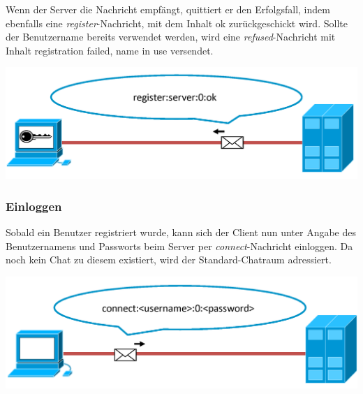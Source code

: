 \documentclass[12pt,a4paper,bibliography=totocnumbered,listof=totocnumbered]{scrartcl}
\begin{document}
Wenn der Server die Nachricht empfängt, quittiert er den Erfolgsfall, indem ebenfalls eine  \textit{register}-Nachricht, mit dem Inhalt \glqq ok\grqq{} zurückgeschickt wird. Sollte der Benutzername bereits verwendet werden, wird eine \textit{refused}-Nachricht mit Inhalt \glqq registration failed, name in use\grqq{} versendet.

\vspace{1em}
\begin{minipage}{\linewidth}
	\centering
	\includegraphics[width=0.7\linewidth]{img/register2.png}
	\label{fig:Registrierung2}
\end{minipage}
\vspace{0.5em}

\subsubsection{Einloggen}
Sobald ein Benutzer registriert wurde, kann sich der Client nun unter Angabe des Benutzernamens und Passworts beim Server per \textit{connect}-Nachricht einloggen. Da noch kein Chat zu diesem existiert, wird der Standard-Chatraum adressiert.

\vspace{1em}
\begin{minipage}{\linewidth}
	\centering
	\includegraphics[width=0.7\linewidth]{img/connect1.png}
	\label{fig:connect1}
\end{minipage}
\vspace{0.5em} 
\end{document}
